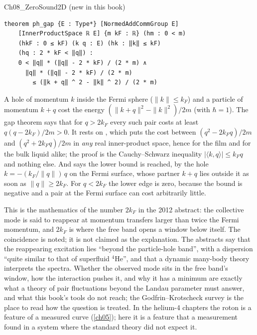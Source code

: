 \begin{leanbox}{Ch08\_ZeroSound2D (new in this book)}
\begin{lstlisting}[style=lean]
theorem ph_gap {E : Type*} [NormedAddCommGroup E]
    [InnerProductSpace ℝ E] {m kF : ℝ} (hm : 0 < m)
    (hkF : 0 ≤ kF) (k q : E) (hk : ‖k‖ ≤ kF)
    (hq : 2 * kF < ‖q‖) :
    0 < ‖q‖ * (‖q‖ - 2 * kF) / (2 * m) ∧
      ‖q‖ * (‖q‖ - 2 * kF) / (2 * m)
        ≤ (‖k + q‖ ^ 2 - ‖k‖ ^ 2) / (2 * m)
\end{lstlisting}
\end{leanbox}

A hole of momentum $k$ inside the Fermi sphere ($\|k\|\le k_F$) and a particle of momentum $k+q$ cost the energy $(\|k+q\|^2-\|k\|^2)/2m$ (with $\hbar=1$).
The gap theorem says that for $q>2k_F$ every such pair costs at least $q(q-2k_F)/2m>0$.
It rests on , which puts the cost between $(q^2-2k_Fq)/2m$ and $(q^2+2k_Fq)/2m$ in \emph{any} real inner-product space, hence for the film and for the bulk liquid alike; the proof is the Cauchy--Schwarz inequality $|\langle k,q\rangle|\le k_Fq$ and nothing else.
And  says the lower bound is reached, by the hole $k=-(k_F/\|q\|)\,q$ on the Fermi surface, whose partner $k+q$ lies outside it as soon as $\|q\|\ge2k_F$.
For $q<2k_F$ the lower edge is zero, because the bound is negative and a pair at the Fermi surface can cost arbitrarily little.

This is the mathematics of the number $2k_F$ in the 2012 abstract: the collective mode is said to reappear at momentum transfers larger than twice the Fermi momentum, and $2k_F$ is where the free band opens a window below itself.
The coincidence is noted; it is not claimed as the explanation.
The abstracts say that the reappearing excitation lies ``beyond the particle-hole band'', with a dispersion ``quite similar to that of superfluid $^4$He'', and that a dynamic many-body theory interprets the spectra.
Whether the observed mode sits in the free band's window, how the interaction pushes it, and why it has a minimum are exactly what a theory of pair fluctuations beyond the Landau parameter must answer, and what this book's tools do not reach; the Godfrin--Krotscheck survey \cite{GodfrinKrotscheck2022} is the place to read how the question is treated.
In the helium-4 chapters the roton is a feature of a measured curve (\cref{ch05}); here it is a feature that a measurement found in a system where the standard theory did not expect it.

